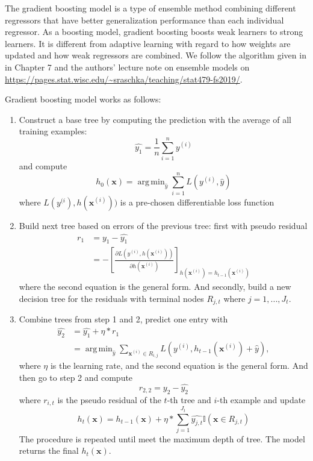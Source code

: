 \documentclass[12pt]{article} %
\DeclareMathOperator*{\argmin}{arg\,min}
\begin{document}
{       The gradient boosting model is a type of ensemble method combining different regressors that have better generalization performance than each individual regressor. As a boosting model, gradient boosting boosts weak learners to strong learners. It is different from adaptive learning with regard to how weights are updated and how weak regressors are combined. We follow the algorithm given in \cite{Raschka2019} in Chapter 7 and the authors' lecture note on ensemble models on \url{https://pages.stat.wisc.edu/~sraschka/teaching/stat479-fs2019/}.\par

       Gradient boosting model works as follows:
       \begin{enumerate}
           \item Construct a base tree by computing the prediction with the average of all training examples: 
           \begin{equation}
               \hat{y_1} = \frac{1}{n}\sum^n_{i=1} y^{(i)}
           \end{equation}
           and compute $$
           h_0(\textbf{x}) = \argmin_{\hat{y}}\sum^n_{i=1}L(y^{(i)}, \hat{y})$$ where $L(y^{(i}),h(\textbf{x}^{(i)}))$ is a pre-chosen differentiable loss function
           \item Build next tree based on errors of the previous tree: first with pseudo residual
           \begin{align}
               r_1 &= y_1 - \hat{y_1} \\
                &= -[\frac{\partial L(y^{(i)}, h(\textbf{x}^{(i)}))}{\partial h(\textbf{x}^{(i)})}]_{h(\textbf{x}^{(i)})=h_{t-1}(\textbf{x}^{(i)})}
           \end{align}
           where the second equation is the general form. And secondly, build a new decision tree for the residuals with terminal nodes $R_{j,t}$ where $j=1,...,J_t$.
           \item Combine trees from step 1 and 2, predict one entry with
           \begin{align}
               \hat{y_2} &= \hat{y_1} + \eta * r_1\\ &= \argmin_{\hat{y}}\sum_{\textbf{x}^{(i)}\in R_{i,j}}L(y^{(i)}, h_{t-1}(\textbf{x}^{(i)})+\hat{y}),
           \end{align}
           where $\eta$ is the learning rate, and the second equation is the general form. And then go to step 2 and compute
           \begin{equation}
               r_{2, 2} = y_2 - \hat{y_2}
           \end{equation}
           where $r_{i,t}$ is the pseudo residual of the $t$-th tree and $i$-th example and update
           \begin{equation}
               h_t(\textbf{x}) = h_{t-1}(\textbf{x}) + \eta * \sum_{j=1}^{J_t} \hat{y_{j,t}} \mathbb{I}(\textbf{x}\in R_{j,t})
           \end{equation}
           The procedure is repeated until meet the maximum depth of tree. The model returns the final $h_t(\textbf{x})$.
       \end{enumerate}

}
\end{document}
